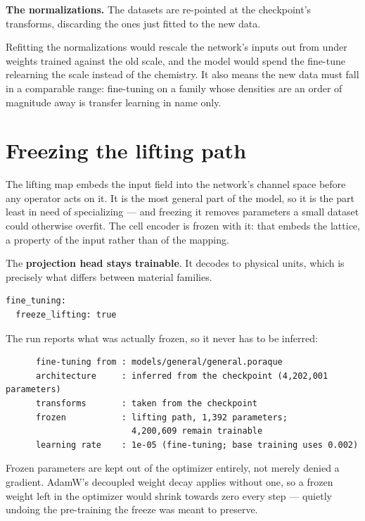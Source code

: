 \textbf{The normalizations.} The datasets are re-pointed at the checkpoint's
transforms, discarding the ones just fitted to the new data.

\begin{pwarn}
Refitting the normalizations would rescale the network's inputs out from under
weights trained against the old scale, and the model would spend the fine-tune
relearning the scale instead of the chemistry. It also means the new data must
fall in a comparable range: fine-tuning on a family whose densities are an
order of magnitude away is transfer learning in name only.
\end{pwarn}

\section{Freezing the lifting path}

The lifting map embeds the input field into the network's channel space before
any operator acts on it. It is the most general part of the model, so it is the
part least in need of specializing --- and freezing it removes parameters a
small dataset could otherwise overfit. The cell encoder is frozen with it: that
embeds the lattice, a property of the input rather than of the mapping.

The \textbf{projection head stays trainable}. It decodes to physical units,
which is precisely what differs between material families.

\begin{lstlisting}
fine_tuning:
  freeze_lifting: true
\end{lstlisting}

The run reports what was actually frozen, so it never has to be inferred:

\begin{lstlisting}
      fine-tuning from : models/general/general.poraque
      architecture     : inferred from the checkpoint (4,202,001 parameters)
      transforms       : taken from the checkpoint
      frozen           : lifting path, 1,392 parameters;
                         4,200,609 remain trainable
      learning rate    : 1e-05 (fine-tuning; base training uses 0.002)
\end{lstlisting}

\begin{ptip}
Frozen parameters are kept out of the optimizer entirely, not merely denied a
gradient. AdamW's decoupled weight decay applies without one, so a frozen
weight left in the optimizer would shrink towards zero every step --- quietly
undoing the pre-training the freeze was meant to preserve.
\end{ptip}

